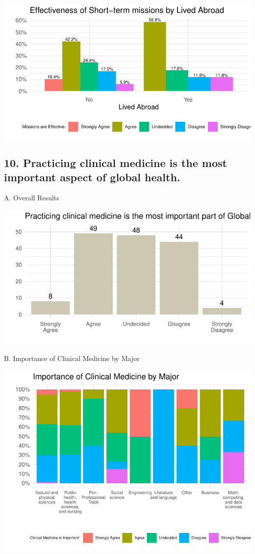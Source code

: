 \documentclass[
  letterpaper,
  DIV=11,
  numbers=noendperiod]{scrartcl}
\begin{document}
\includegraphics{GlobalHealthQuarto6-10_files/figure-pdf/unnamed-chunk-15-1.pdf}

\newpage

\hypertarget{practicing-clinical-medicine-is-the-most-important-aspect-of-global-health.}{%
\subsection{10. Practicing clinical medicine is the most important
aspect of global
health.}\label{practicing-clinical-medicine-is-the-most-important-aspect-of-global-health.}}

A. Overall Results

\includegraphics{GlobalHealthQuarto6-10_files/figure-pdf/unnamed-chunk-16-1.pdf}

\newpage

B. Importance of Clinical Medicine by Major

\includegraphics{GlobalHealthQuarto6-10_files/figure-pdf/unnamed-chunk-17-1.pdf}
\end{document}
